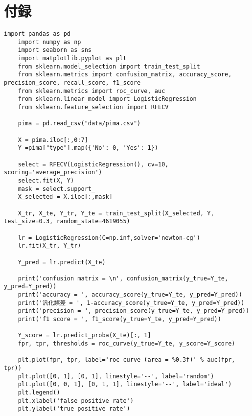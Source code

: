 \documentclass[12pt]{jarticle}
\begin{document}
\section{付録}
\begin{lstlisting}[style = py,caption=レポート課題1]
    import pandas as pd
    import numpy as np
    import seaborn as sns
    import matplotlib.pyplot as plt
    from sklearn.model_selection import train_test_split
    from sklearn.metrics import confusion_matrix, accuracy_score, precision_score, recall_score, f1_score
    from sklearn.metrics import roc_curve, auc
    from sklearn.linear_model import LogisticRegression
    from sklearn.feature_selection import RFECV
    
    pima = pd.read_csv("data/pima.csv")
    
    X = pima.iloc[:,0:7]
    Y =pima["type"].map({'No': 0, 'Yes': 1})
    
    select = RFECV(LogisticRegression(), cv=10, scoring='average_precision')
    select.fit(X, Y)
    mask = select.support_
    X_selected = X.iloc[:,mask]
    
    X_tr, X_te, Y_tr, Y_te = train_test_split(X_selected, Y, test_size=0.3, random_state=4619055)
    
    lr = LogisticRegression(C=np.inf,solver='newton-cg') 
    lr.fit(X_tr, Y_tr)
    
    Y_pred = lr.predict(X_te)
    
    print('confusion matrix = \n', confusion_matrix(y_true=Y_te, y_pred=Y_pred))
    print('accuracy = ', accuracy_score(y_true=Y_te, y_pred=Y_pred))
    print('汎化誤差 = ', 1-accuracy_score(y_true=Y_te, y_pred=Y_pred))
    print('precision = ', precision_score(y_true=Y_te, y_pred=Y_pred))
    print('f1 score = ', f1_score(y_true=Y_te, y_pred=Y_pred))
    
    Y_score = lr.predict_proba(X_te)[:, 1]
    fpr, tpr, thresholds = roc_curve(y_true=Y_te, y_score=Y_score)
    
    plt.plot(fpr, tpr, label='roc curve (area = %0.3f)' % auc(fpr, tpr))
    plt.plot([0, 1], [0, 1], linestyle='--', label='random')
    plt.plot([0, 0, 1], [0, 1, 1], linestyle='--', label='ideal')
    plt.legend()
    plt.xlabel('false positive rate')
    plt.ylabel('true positive rate')
\end{lstlisting}
\end{document}
